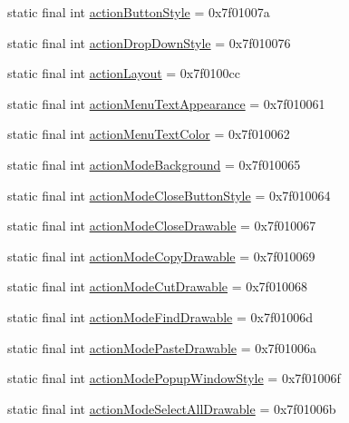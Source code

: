 \begin{CompactItemize}
\item 
static final int \hyperlink{classandroid_1_1support_1_1v4_1_1_r_1_1attr_e6095b7eb874ac2a50e761b6f74ab8b4}{actionButtonStyle} = 0x7f01007a
\item 
static final int \hyperlink{classandroid_1_1support_1_1v4_1_1_r_1_1attr_370e3423233a4e58c6f52c9932793e14}{actionDropDownStyle} = 0x7f010076
\item 
static final int \hyperlink{classandroid_1_1support_1_1v4_1_1_r_1_1attr_ec38bd01510dcdeac9d0e254f0b6341f}{actionLayout} = 0x7f0100cc
\item 
static final int \hyperlink{classandroid_1_1support_1_1v4_1_1_r_1_1attr_422ed2aedf8bd2bc9b9104d2f184ee07}{actionMenuTextAppearance} = 0x7f010061
\item 
static final int \hyperlink{classandroid_1_1support_1_1v4_1_1_r_1_1attr_27b8f26ccf5b14d7417b185de70ed9c3}{actionMenuTextColor} = 0x7f010062
\item 
static final int \hyperlink{classandroid_1_1support_1_1v4_1_1_r_1_1attr_a010fbbfc905baa38cb1c179cec94e2f}{actionModeBackground} = 0x7f010065
\item 
static final int \hyperlink{classandroid_1_1support_1_1v4_1_1_r_1_1attr_fbdc0ed02b55b971a5cede6c7a27e92a}{actionModeCloseButtonStyle} = 0x7f010064
\item 
static final int \hyperlink{classandroid_1_1support_1_1v4_1_1_r_1_1attr_286380d6e81458920bc75a0e73ba6ea2}{actionModeCloseDrawable} = 0x7f010067
\item 
static final int \hyperlink{classandroid_1_1support_1_1v4_1_1_r_1_1attr_a5aae54d2504bc25d94020d1ae27111a}{actionModeCopyDrawable} = 0x7f010069
\item 
static final int \hyperlink{classandroid_1_1support_1_1v4_1_1_r_1_1attr_af0edb67fe898da7c0809a12b872b24d}{actionModeCutDrawable} = 0x7f010068
\item 
static final int \hyperlink{classandroid_1_1support_1_1v4_1_1_r_1_1attr_06b60d787984260aa00be5630593ee08}{actionModeFindDrawable} = 0x7f01006d
\item 
static final int \hyperlink{classandroid_1_1support_1_1v4_1_1_r_1_1attr_b7d90b95ada44484214f96b068480f72}{actionModePasteDrawable} = 0x7f01006a
\item 
static final int \hyperlink{classandroid_1_1support_1_1v4_1_1_r_1_1attr_c3483400b7248477261c8d555ffa2d09}{actionModePopupWindowStyle} = 0x7f01006f
\item 
static final int \hyperlink{classandroid_1_1support_1_1v4_1_1_r_1_1attr_b712be6c38e278a2a25340b2729fdcf1}{actionModeSelectAllDrawable} = 0x7f01006b

\end{CompactItemize}
